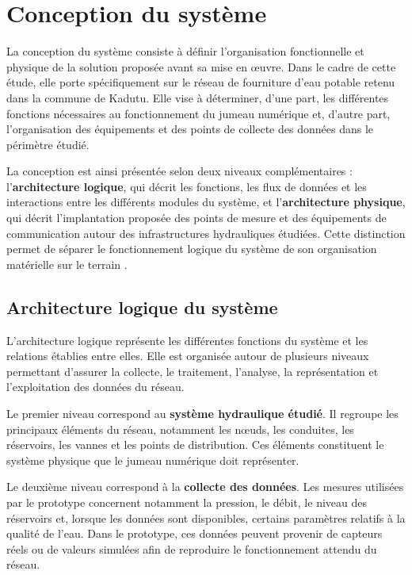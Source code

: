 \section{Conception du système}
\label{conception-du-systuxe8me}

La conception du système consiste à définir l'organisation fonctionnelle
et physique de la solution proposée avant sa mise en œuvre. Dans le cadre
de cette étude, elle porte spécifiquement sur le réseau de fourniture
d'eau potable retenu dans la commune de Kadutu. Elle vise à déterminer,
d'une part, les différentes fonctions nécessaires au fonctionnement du
jumeau numérique et, d'autre part, l'organisation des équipements et des
points de collecte des données dans le périmètre étudié.

La conception est ainsi présentée selon deux niveaux complémentaires :
l'\textbf{architecture logique}, qui décrit les fonctions, les flux de
données et les interactions entre les différents modules du système, et
l'\textbf{architecture physique}, qui décrit l'implantation proposée des
points de mesure et des équipements de communication autour des
infrastructures hydrauliques étudiées. Cette distinction permet de
séparer le fonctionnement logique du système de son organisation
matérielle sur le terrain \cite{ref106}.

\subsection{Architecture logique du système}
\label{architecture-logique-du-systeme}

L'architecture logique représente les différentes fonctions du système
et les relations établies entre elles. Elle est organisée autour de
plusieurs niveaux permettant d'assurer la collecte, le traitement,
l'analyse, la représentation et l'exploitation des données du réseau.

Le premier niveau correspond au \textbf{système hydraulique étudié}.
Il regroupe les principaux éléments du réseau, notamment les nœuds, les
conduites, les réservoirs, les vannes et les points de distribution.
Ces éléments constituent le système physique que le jumeau numérique
doit représenter.

Le deuxième niveau correspond à la \textbf{collecte des données}. Les
mesures utilisées par le prototype concernent notamment la pression, le
débit, le niveau des réservoirs et, lorsque les données sont
disponibles, certains paramètres relatifs à la qualité de l'eau. Dans
le prototype, ces données peuvent provenir de capteurs réels ou de
valeurs simulées afin de reproduire le fonctionnement attendu du réseau.

